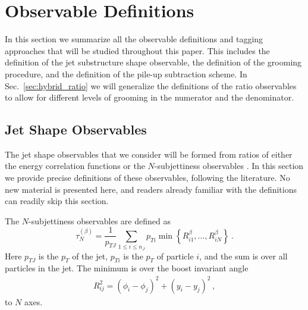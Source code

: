 \documentclass[11pt,letterpaper]{article}
\DeclareRobustCommand{\Sec}[1]{Sec.~\ref{#1}}
\newcommand{\Nsub}[2]{\tau_{#1}^{(#2)}}
\begin{document}
\section{Observable Definitions}\label{sec:obs_def}

In this section we summarize all the observable definitions and tagging approaches that will be studied throughout this paper. This includes the definition of the jet substructure shape observable, the definition of the grooming procedure, and the definition of the pile-up subtraction scheme. In \Sec{sec:hybrid_ratio} we will generalize the definitions of the ratio observables to allow for different levels of grooming in the numerator and the denominator.



\subsection{Jet Shape Observables}\label{sec:shape_def}

The jet shape observables that we consider will be formed from ratios of either the energy correlation functions \cite{Larkoski:2013eya,Moult:2016cvt} or the $N$-subjettiness observables \cite{Thaler:2010tr,Thaler:2011gf}. In this section we provide precise definitions of these observables, following the literature. No new material is presented here, and readers already familiar with the definitions can readily skip this section.

The $N$-subjettiness observables are defined as \cite{Stewart:2010tn,Thaler:2010tr,Thaler:2011gf}
\begin{equation}\label{eq:nsubdef}
\Nsub{N}{\beta} = \frac{1}{p_{TJ}}\sum_{1\leq i \leq n_J} p_{Ti}\min\left\{
R_{i1}^\beta,\dotsc,R_{iN}^\beta
\right\} \ .
\end{equation}
Here $p_{TJ}$ is the $p_T$ of the jet,  $p_{Ti}$ is the $p_T$ of particle $i$, and the sum is over all particles in the jet. The minimum is over the boost invariant angle
\begin{align}\label{eq:ptratio}  
R_{ij}^2 = (\phi_i-\phi_j)^2+(y_i-y_j)^2\,,
\end{align}
to $N$ axes.
\end{document}
